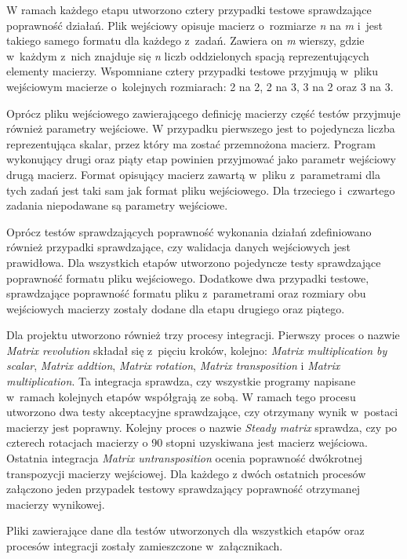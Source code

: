 W ramach każdego etapu utworzono cztery przypadki testowe sprawdzające poprawność działań.
Plik wejściowy opisuje macierz o~rozmiarze \textit{n} na \textit{m} i~jest takiego samego formatu dla każdego z~zadań.
Zawiera on \textit{m} wierszy, gdzie w~każdym z~nich znajduje się \textit{n} liczb oddzielonych spacją reprezentujących elementy macierzy.
Wspomniane cztery przypadki testowe przyjmują w~pliku wejściowym macierze o~kolejnych rozmiarach: 2 na 2, 2 na 3, 3 na 2 oraz 3 na 3.

Oprócz pliku wejściowego zawierającego definicję macierzy część testów przyjmuje również parametry wejściowe.
W przypadku pierwszego jest to pojedyncza liczba reprezentująca skalar, przez który ma zostać przemnożona macierz.
Program wykonujący drugi oraz piąty etap powinien przyjmować jako parametr wejściowy drugą macierz.
Format opisujący macierz zawartą w~pliku z~parametrami dla tych zadań jest taki sam jak format pliku wejściowego.
Dla trzeciego i~czwartego zadania niepodawane są parametry wejściowe.

Oprócz testów sprawdzających poprawność wykonania działań zdefiniowano również przypadki sprawdzające, czy walidacja danych wejściowych jest prawidłowa.
Dla wszystkich etapów utworzono pojedyncze testy sprawdzające poprawność formatu pliku wejściowego.
Dodatkowe dwa przypadki testowe, sprawdzające poprawność formatu pliku z~parametrami oraz rozmiary obu wejściowych macierzy zostały dodane dla etapu drugiego oraz piątego.

Dla projektu utworzono również trzy procesy integracji.
Pierwszy proces o nazwie \textit{Matrix revolution} składał się z~pięciu kroków, kolejno: \textit{Matrix multiplication by scalar}, \textit{Matrix addtion}, \textit{Matrix rotation}, \textit{Matrix transposition} i \textit{Matrix multiplication}.
Ta integracja sprawdza, czy wszystkie programy napisane w~ramach kolejnych etapów współgrają ze sobą.
W ramach tego procesu utworzono dwa testy akceptacyjne sprawdzające, czy otrzymany wynik w~postaci macierzy jest poprawny.
Kolejny proces o nazwie \textit{Steady matrix} sprawdza, czy po czterech rotacjach macierzy o 90 stopni uzyskiwana jest macierz wejściowa.
Ostatnia integracja \textit{Matrix untransposition} ocenia poprawność dwókrotnej transpozycji macierzy wejściowej.
Dla każdego z dwóch ostatnich procesów załączono jeden przypadek testowy sprawdzający poprawność otrzymanej macierzy wynikowej.

Pliki zawierające dane dla testów utworzonych dla wszystkich etapów oraz procesów integracji zostały zamieszczone w~załącznikach.

